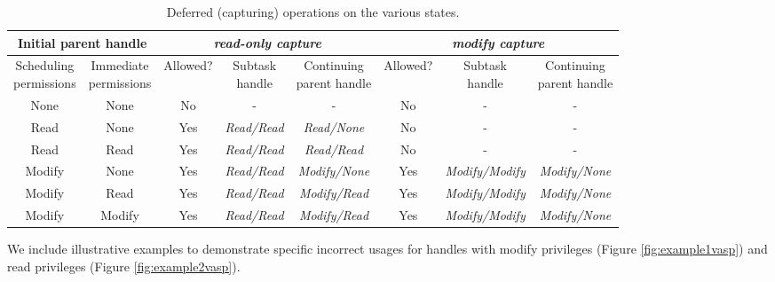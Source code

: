 \begin{table}[!t]
\begin{center}
{\small
\begin{tabular}{cc|ccc|ccc}
 \hline
 \multicolumn{2}{c|}{Initial parent handle} 
 & \multicolumn{3}{c|}{\em{read-only capture}} 
 & \multicolumn{3}{c}{\em{modify capture}}  \\
 \hline
 \specialcell{Scheduling\\ permissions} 
 & \specialcell{Immediate\\ permissions}  
 & {\footnotesize Allowed? } &  \specialcell{\footnotesize Subtask\\handle} 
 &  \specialcell{\footnotesize Continuing\\parent handle} 
 & {\footnotesize Allowed? } &  \specialcell{\footnotesize Subtask\\handle} 
 &  \specialcell{\footnotesize Continuing\\parent handle} \\
 \hline
 None & None & No & - & - & No & - & - \\
 Read & None 
 & Yes 
 & {\em Read/Read}
 & {\em Read/None}
 & No
 & -
 & - \\
 Read & Read
 & Yes 
 & {\em Read/Read}
 & {\em Read/Read}
 & No
 & -
 & - \\
 Modify & None
 & Yes 
 & {\em Read/Read}
 & {\em Modify/None}
 & Yes
 & {\em Modify/Modify} 
 & {\em Modify/None} \\
 Modify & Read
 & Yes 
 & {\em Read/Read}
 & {\em Modify/Read}
 & Yes
 & {\em Modify/Modify} 
 & {\em Modify/None} \\
 Modify & Modify
 & Yes 
 & {\em Read/Read} 
 & {\em Modify/Read} 
 & Yes
 & {\em Modify/Modify}
 & {\em Modify/None} \\
\end{tabular}
}
\caption{Deferred (capturing) operations on the various states.}
\label{tab:capsimp}
\end{center}
\end{table}

We include illustrative examples to demonstrate specific incorrect usages for handles with modify privileges (Figure \ref{fig:example1vasp}) and read privileges (Figure \ref{fig:example2vasp}).

